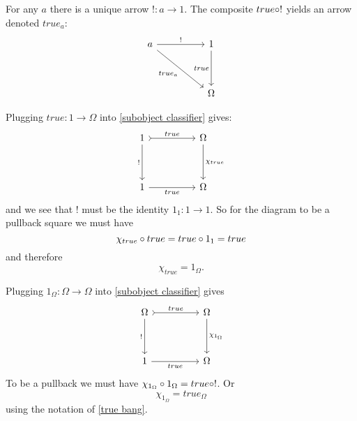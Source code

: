     \begin{defi} \label{true bang}
        For any $a$ there is a unique arrow $!: a \to 1$. The composite $true \circ !$ yields an arrow denoted $true_a$:
        \[\begin{tikzcd}
            {a} && {1} \\
            \\
            && {\Omega}
            \arrow["{true}"', from=1-3, to=3-3]
            \arrow["{!}", from=1-1, to=1-3]
            \arrow["{true_a}"', from=1-1, to=3-3]
        \end{tikzcd}\]
    \end{defi}

    \begin{exercise}
        Plugging $ true : 1 \to \Omega$ into \cref{subobject classifier} gives:
        \[\begin{tikzcd}
            {1} && {\Omega} \\
            \\
            {1} && {\Omega}
            \arrow["{true}", from=1-1, to=1-3, tail]
            \arrow["{!}"', from=1-1, to=3-1]
            \arrow["{\chi_{true}}", from=1-3, to=3-3]
            \arrow["{true}"', from=3-1, to=3-3]
        \end{tikzcd}\]
        and we see that $!$ must be the identity $1_1 : 1 \to 1$.
        So for the diagram to be a pullback square we must have
        $$\chi_{true} \circ true = true \circ 1_1 = true$$
        and therefore
        $$\chi_{true} = 1_\Omega.$$
    \end{exercise}

    \begin{exercise}
        Plugging $1_\Omega : \Omega \to \Omega$ into \cref{subobject classifier} gives 
        \[\begin{tikzcd}
            {\Omega} && {\Omega} \\
            \\
            {1} && {\Omega}
            \arrow["{true}", from=1-1, to=1-3, tail]
            \arrow["{!}"', from=1-1, to=3-1]
            \arrow["{\chi_{1_\Omega}}", from=1-3, to=3-3]
            \arrow["{true}"', from=3-1, to=3-3]
        \end{tikzcd}\]
        To be a pullback we must have 
        $\chi_{1_\Omega} \circ 1_\Omega = true \circ !$.
        Or
        $$\chi_{1_\Omega} = true_\Omega$$
        using the notation of \cref{true bang}.
    \end{exercise}

